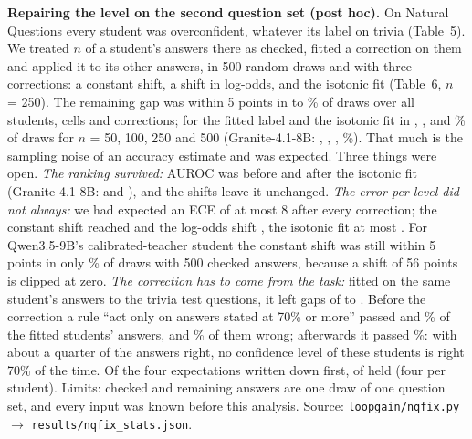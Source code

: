 \documentclass[10pt]{article}
\begin{document}
\textbf{Repairing the level on the second question set (post hoc).} On Natural Questions every student was overconfident, whatever its label on trivia (Table~5). We treated $n$ of a student's answers there as checked, fitted a correction on them and applied it to its other answers, in 500 random draws and with three corrections: a constant shift, a shift in log-odds, and the isotonic fit (Table~6, $n$ = 250). The remaining gap was within 5 points in \qWithinMin{} to \qWithinMax{}\% of draws over all students, cells and corrections; for the fitted label and the isotonic fit in \qQScalWithinFifty{}, \qQScalWithinHundred{}, \qQScalWithin{} and \qQScalWithinFiveHundred{}\% of draws for $n$ = 50, 100, 250 and 500 (Granite-4.1-8B: \qGScalWithinFifty{}, \qGScalWithinHundred{}, \qGScalWithin{}, \qGScalWithinFiveHundred{}\%). That much is the sampling noise of an accuracy estimate and was expected. Three things were open. \emph{The ranking survived:} AUROC was \qQScalAurocBefore{} before and \qQScalAurocIso{} after the isotonic fit (Granite-4.1-8B: \qGScalAurocBefore{} and \qGScalAurocIso{}), and the shifts leave it unchanged. \emph{The error per level did not always:} we had expected an ECE of at most 8 after every correction; the constant shift reached \qEceShiftMax{} and the log-odds shift \qEceLogoddsMax{}, the isotonic fit at most \qEceIsoMax{}. For Qwen3.5-9B's calibrated-teacher student the constant shift was still within 5 points in only \qQTcalShiftWithinFiveHundred{}\% of draws with 500 checked answers, because a shift of 56 points is clipped at zero. \emph{The correction has to come from the task:} fitted on the same student's answers to the trivia test questions, it left gaps of \qTrivMin{} to \qTrivMax{}. Before the correction a rule ``act only on answers stated at 70\% or more'' passed \qQScalPass{} and \qGScalPass{}\% of the fitted students' answers, \qQScalWrong{} and \qGScalWrong{}\% of them wrong; afterwards it passed \qPassAfterMax{}\%: with about a quarter of the answers right, no confidence level of these students is right 70\% of the time. Of the four expectations written down first, \qExpHeld{} of \qExpAll{} held (four per student). Limits: checked and remaining answers are one draw of one question set, and every input was known before this analysis. Source: \texttt{loopgain/nqfix.py} $\to$ \texttt{results/nqfix\_stats.json}.

\begin{table}[h]
\centering\footnotesize
\caption{\textbf{Table 6. Repairing the level on Natural Questions with 250 checked answers (post hoc).} Students of the extension arm, sampled answer; Fmt: \% of the 1{,}000 replies in format (22 to 28\% of them right). Gap before any correction, and after the isotonic correction fitted on the same student's trivia answers (Trivia). Then, fitted on 250 answers drawn at random and applied to the others (500 draws), for a constant shift, a log-odds shift (Log) and the isotonic fit (Iso): \% of draws with a remaining gap within 5 points, and mean ECE (before: equal to the gap); AUROC before and after the isotonic fit. Labels as in Table 2. Source: \texttt{loopgain/nqfix.py} $\to$ \texttt{results/nqfix\_stats.json}.}
\tableNqfix
\end{table}
\end{document}
